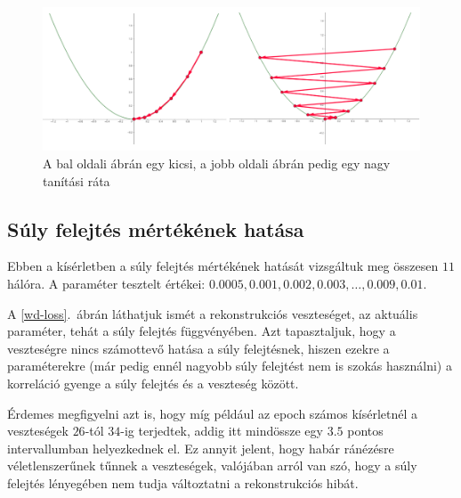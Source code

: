 \begin{figure}[h!]
  
  
	\begin{center}
	\includegraphics[width=1\linewidth]{parabolas.png}
	\end{center}
	
  \caption{A bal oldali ábrán egy kicsi, a jobb oldali ábrán pedig egy nagy tanítási ráta}\label{para}
\end{figure}



\subsection{Súly felejtés mértékének hatása}

Ebben a kísérletben a súly felejtés mértékének hatását vizsgáltuk meg összesen $11$ hálóra. A paraméter tesztelt értékei: $0.0005, 0.001, 0.002, 0.003, \dots , 0.009, 0.01$.

A \ref{wd-loss}.~ábrán láthatjuk ismét a rekonstrukciós veszteséget, az aktuális paraméter, tehát a súly felejtés függvényében. Azt tapasztaljuk, hogy a veszteségre nincs számottevő hatása a súly felejtésnek, hiszen ezekre a paraméterekre (már pedig ennél nagyobb súly felejtést nem is szokás használni) a korreláció gyenge a súly felejtés és a veszteség között. 

Érdemes megfigyelni azt is, hogy míg például az epoch számos kísérletnél a veszteségek $26$-tól $34$-ig terjedtek, addig itt mindössze egy $3.5$ pontos intervallumban helyezkednek el. Ez annyit jelent, hogy habár ránézésre véletlenszerűnek tűnnek a veszteségek, valójában arról van szó, hogy a súly felejtés lényegében nem tudja változtatni a rekonstrukciós hibát.


